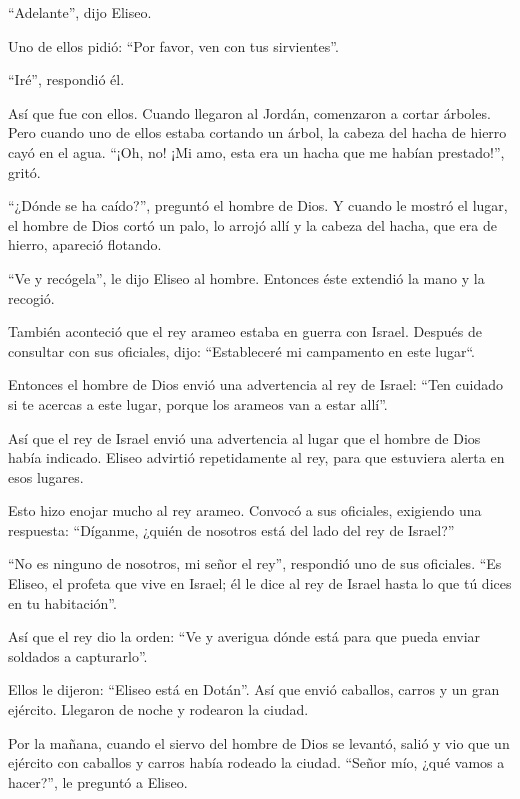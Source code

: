 ``Adelante'', dijo Eliseo.

 Uno de ellos pidió: ``Por favor, ven con tus sirvientes''.

``Iré'', respondió él.

 Así que fue con ellos. Cuando llegaron al Jordán,
comenzaron a cortar árboles.  Pero cuando uno de ellos
estaba cortando un árbol, la cabeza del hacha de hierro cayó en el agua.
``¡Oh, no! ¡Mi amo, esta era un hacha que me habían prestado!'', gritó.

 ``¿Dónde se ha caído?'', preguntó el hombre de Dios. Y
cuando le mostró el lugar, el hombre de Dios cortó un palo, lo arrojó
allí y la cabeza del hacha, que era de hierro, apareció flotando.

 ``Ve y recógela'', le dijo Eliseo al hombre. Entonces éste
extendió la mano y la recogió.

 También aconteció que el rey arameo estaba en guerra con
Israel. Después de consultar con sus oficiales, dijo: ``Estableceré mi
campamento en este lugar``.

 Entonces el hombre de Dios envió una advertencia al rey de
Israel: ``Ten cuidado si te acercas a este lugar, porque los arameos van
a estar allí''.

 Así que el rey de Israel envió una advertencia al lugar
que el hombre de Dios había indicado. Eliseo advirtió repetidamente al
rey, para que estuviera alerta en esos lugares.

 Esto hizo enojar mucho al rey arameo. Convocó a sus
oficiales, exigiendo una respuesta: ``Díganme, ¿quién de nosotros está
del lado del rey de Israel?''

 ``No es ninguno de nosotros, mi señor el rey'', respondió
uno de sus oficiales. ``Es Eliseo, el profeta que vive en Israel; él le
dice al rey de Israel hasta lo que tú dices en tu habitación''.

 Así que el rey dio la orden: ``Ve y averigua dónde está
para que pueda enviar soldados a capturarlo''.

Ellos le dijeron: ``Eliseo está en Dotán''.  Así que envió
caballos, carros y un gran ejército. Llegaron de noche y rodearon la
ciudad.

 Por la mañana, cuando el siervo del hombre de Dios se
levantó, salió y vio que un ejército con caballos y carros había rodeado
la ciudad. ``Señor mío, ¿qué vamos a hacer?'', le preguntó a Eliseo.

